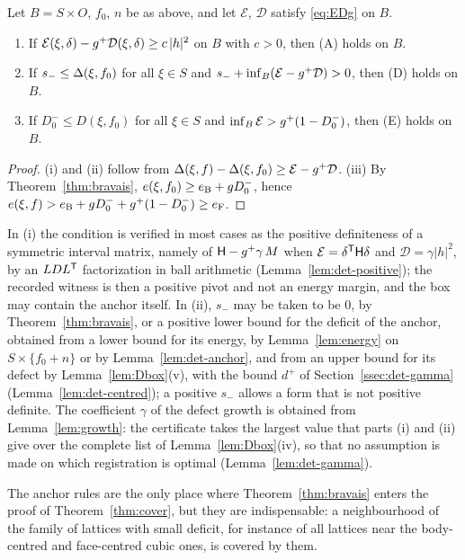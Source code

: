 \begin{lemma}\label{lem:anchor}
Let $B=S\times O$, $f_0$, $n$ be as above, and let $\mathcal E$, $\mathcal D$ satisfy \eqref{eq:EDg} on $B$.
\begin{enumerate}
\item[\textup{(i)}] If $\mathcal E(\xi,\delta)-g^+\mathcal D(\xi,\delta)\ge c\,|h|^2$ on $B$ with $c>0$, then \textup{(A)} holds on $B$.
\item[\textup{(ii)}] If $s_-\le\Delta(\xi,f_0)$ for all $\xi\in S$ and $s_-+\inf_B(\mathcal E-g^+\mathcal D)>0$, then \textup{(D)} holds
on $B$.
\item[\textup{(iii)}] If $D_0^-\le D(\xi,f_0)$ for all $\xi\in S$ and $\inf_B\mathcal E>g^+(1-D_0^-)$, then \textup{(E)} holds on $B$.
\end{enumerate}
\end{lemma}

\begin{proof}
(i) and (ii) follow from $\Delta(\xi,f)-\Delta(\xi,f_0)\ge\mathcal E-g^+\mathcal D$. (iii) By Theorem~\ref{thm:bravais},
$e(\xi,f_0)\ge e_{\mathrm B}+g D_0^-$, hence $e(\xi,f)>e_{\mathrm B}+g D_0^-+g^+(1-D_0^-)\ge e_{\mathrm F}$.
\end{proof}

In (i) the condition is verified in most cases as the positive definiteness of a symmetric interval matrix, namely of
$\mathsf H-g^+\gamma\,M$ when $\mathcal E=\delta^\mathsf T\mathsf H\delta$ and $\mathcal D=\gamma|h|^2$, by an $LDL^\mathsf T$ factorization in ball
arithmetic (Lemma~\ref{lem:det-positive}); the recorded witness is then a positive pivot and not an energy margin, and the box may
contain the anchor itself. In (ii), $s_-$ may be taken to be $0$, by Theorem~\ref{thm:bravais}, or a positive lower bound
for the deficit of the anchor, obtained from a lower bound for its energy, by Lemma~\ref{lem:energy} on $S\times\{f_0+n\}$ or by
Lemma~\ref{lem:det-anchor}, and from an upper bound for its defect by Lemma~\ref{lem:Dbox}(v), with the bound $d^+$ of
Section~\ref{ssec:det-gamma} (Lemma~\ref{lem:det-centred}); a positive $s_-$ allows a form that is not positive definite. The
coefficient $\gamma$ of the defect growth is obtained from Lemma~\ref{lem:growth}: the certificate takes the largest value that
parts (i) and (ii) give over the complete list of Lemma~\ref{lem:Dbox}(iv), so that no assumption is made on which registration
is optimal (Lemma~\ref{lem:det-gamma}).

The anchor rules are the only place where Theorem~\ref{thm:bravais} enters the proof of Theorem~\ref{thm:cover}, but they are
indispensable: a neighbourhood of the family of lattices with small deficit, for instance of all lattices near the body-centred and
face-centred cubic ones, is covered by them.

